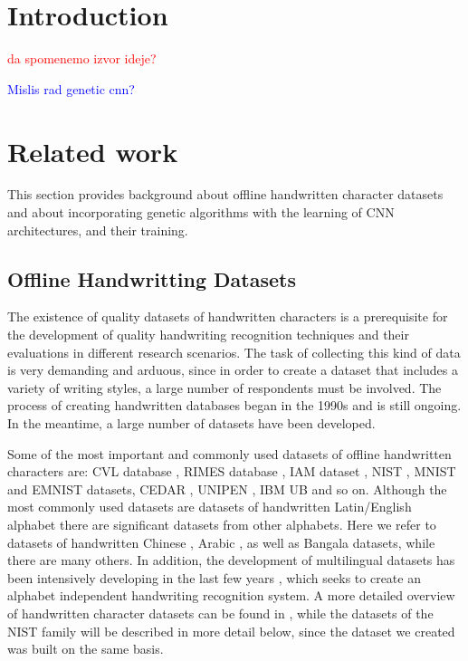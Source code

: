\documentclass[eng]{simposium}
\begin{document}
\section{Introduction}

\textcolor{red}{da spomenemo izvor ideje?}

\textcolor{blue}{Mislis rad genetic cnn?}

\section{Related work}

This section provides background about offline handwritten character datasets and about incorporating genetic algorithms 
with the learning of CNN architectures, and their training. 

\subsection{Offline Handwritting Datasets}

The existence of quality datasets of handwritten characters is a prerequisite for the development of quality handwriting 
recognition techniques and their evaluations in different research scenarios. 
The task of collecting this kind of data is very demanding and arduous, since in order to create a dataset that includes 
a variety of writing styles, a large number of respondents must be involved. 
The process of creating handwritten databases began in the 1990s\cite{9} and is still ongoing. 
In the meantime, a large number of datasets have been developed. 

Some of the most important and commonly used datasets of offline handwritten characters are: CVL database \cite{18}, RIMES database \cite{10}, IAM dataset \cite{11}, 
NIST \cite{12}\cite{13}, MNIST \cite{8} and EMNIST \cite{1} datasets, CEDAR \cite{14}, UNIPEN \cite{15}, IBM UB \cite{16} and so on. 
Although the most commonly used datasets are datasets of handwritten Latin/English alphabet 
there are significant datasets from other alphabets. 
Here we refer to datasets of handwritten Chinese \cite{19}\cite{20}\cite{21}, Arabic \cite{22}\cite{23}, as well as Bangala \cite{24}\cite{25} datasets, while there are many others. 
In addition, the development of multilingual datasets has been intensively developing in the last few years \cite{17}\cite{26}\cite{18}, which seeks to create an alphabet independent handwriting recognition system. 
A more detailed overview of handwritten character datasets can be found in \cite{9}, 
while the datasets of the NIST family will be described in more detail below, since the dataset we created was built on the same basis. 
\end{document}
